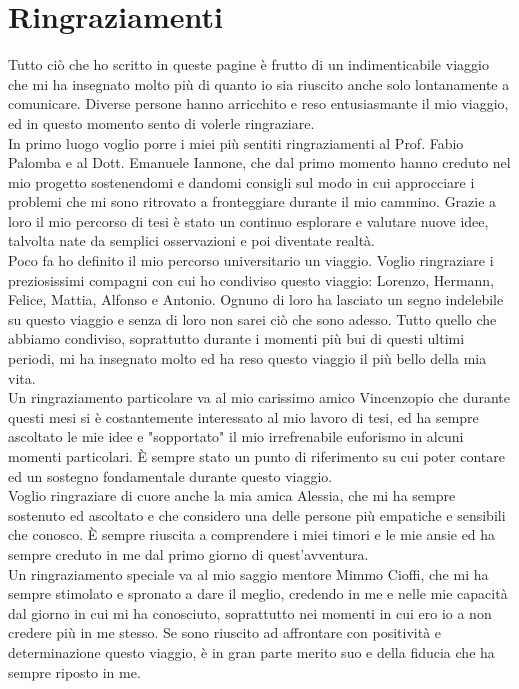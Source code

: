 \chapter{Ringraziamenti}
Tutto ciò che ho scritto in queste pagine è frutto di un indimenticabile viaggio che mi ha insegnato molto più di quanto io sia riuscito anche solo lontanamente a comunicare. Diverse persone hanno arricchito e reso entusiasmante il mio viaggio, ed in questo momento sento di volerle ringraziare.\\
In primo luogo voglio porre i miei più sentiti ringraziamenti al Prof. Fabio Palomba e al Dott. Emanuele Iannone, che dal primo momento hanno creduto nel mio progetto sostenendomi e dandomi consigli sul modo in cui approcciare i problemi che mi sono ritrovato a fronteggiare durante il mio cammino. Grazie a loro il mio percorso di tesi è stato un continuo esplorare e valutare nuove idee, talvolta nate da semplici osservazioni e poi diventate realtà.\\
Poco fa ho definito il mio percorso universitario un viaggio. Voglio ringraziare i preziosissimi compagni con cui ho condiviso questo viaggio: Lorenzo, Hermann, Felice, Mattia, Alfonso e Antonio. Ognuno di loro ha lasciato un segno indelebile su questo viaggio e senza di loro non sarei ciò che sono adesso. Tutto quello che abbiamo condiviso, soprattutto durante i momenti più bui di questi ultimi periodi, mi ha insegnato molto ed ha reso questo viaggio il più bello della mia vita.\\
Un ringraziamento particolare va al mio carissimo amico Vincenzopio che durante questi mesi si è costantemente interessato al mio lavoro di tesi, ed ha sempre ascoltato le mie idee e "sopportato" il mio irrefrenabile euforismo in alcuni momenti particolari. È sempre stato un punto di riferimento su cui poter contare ed un sostegno fondamentale durante questo viaggio.\\
Voglio ringraziare di cuore anche la mia amica Alessia, che mi ha sempre sostenuto ed ascoltato e che considero una delle persone più empatiche e sensibili che conosco. È sempre riuscita a comprendere i miei timori e le mie ansie ed ha sempre creduto in me dal primo giorno di quest'avventura.\\
Un ringraziamento speciale va al mio saggio mentore Mimmo Cioffi, che mi ha sempre stimolato e spronato a dare il meglio, credendo in me e nelle mie capacità dal giorno in cui mi ha conosciuto, soprattutto nei momenti in cui ero io a non credere più in me stesso. Se sono riuscito ad affrontare con positività e determinazione questo viaggio, è in gran parte merito suo e della fiducia che ha sempre riposto in me.\\
